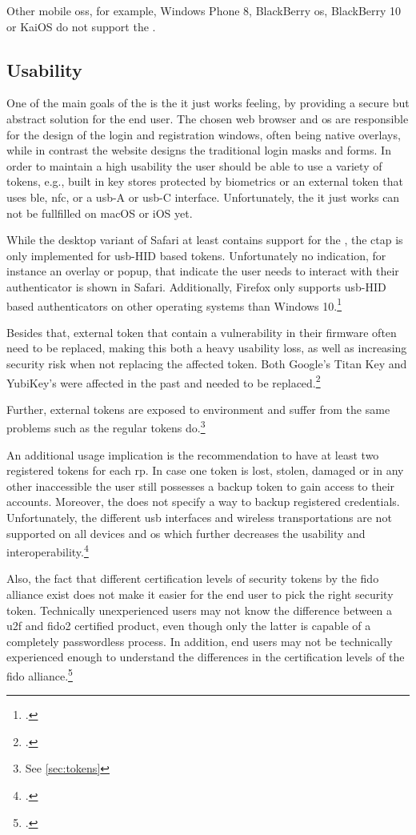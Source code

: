 Other mobile \glspl{os}, for example, Windows Phone 8, BlackBerry \gls{os}, BlackBerry 10 or KaiOS do not support the \wa.

\subsection{Usability}

One of the main goals of the \wa{} is the \frqq it just works\flqq{} feeling, by providing a secure but abstract solution for the end user. The chosen web browser and \gls{os} are responsible for the design of the login and registration windows, often being native overlays, while in contrast the website designs the traditional login masks and forms. In order to maintain a high usability the user should be able to use a variety of tokens, e.g., built in key stores protected by biometrics or an external token that uses \gls{ble}, \gls{nfc}, or a \gls{usb}-A or \gls{usb}-C interface. Unfortunately, the \frqq it just works\flqq{} can not be fullfilled on macOS or iOS yet.

While the desktop variant of Safari at least contains support for the \wa, the \gls{ctap} is only implemented for \gls{usb}-HID based tokens. Unfortunately no indication, for instance an overlay or popup, that indicate the user needs to interact with their authenticator is shown in Safari. Additionally, Firefox only supports \gls{usb}-HID based authenticators on other operating systems than Windows 10.\footcites[See][]{rust-authenticator}

Besides that, external token that contain a vulnerability in their firmware often need to be replaced, making this both a heavy usability loss, as well as increasing security risk when not replacing the affected token. Both Google's Titan Key and YubiKey's were affected in the past and needed to be replaced.\footcites[See][]{yubikey-heise}[See][]{titan-key}

Further, external tokens are exposed to environment and suffer from the same problems such as the regular tokens do.\footnote{See \autoref{sec:tokens}}

An additional usage implication is the recommendation to have at least two registered tokens for each \gls{rp}. In case one token is lost, stolen, damaged or in any other inaccessible the user still possesses a backup token to gain access to their accounts. Moreover, the \wa{} does not specify a way to backup registered credentials. Unfortunately, the different \gls{usb} interfaces and wireless transportations are not supported on all devices and \gls{os} which further decreases the usability and interoperability.\footcites[See][Chapter 13.6]{w3c}[See][15]{das2018johnny}

Also, the fact that different certification levels of security tokens by the \gls{fido} alliance exist does not make it easier for the end user to pick the right security token. Technically unexperienced users may not know the difference between a \gls{u2f} and \gls{fido}2 certified product, even though only the latter is capable of a completely passwordless process. In addition, end users may not be technically experienced enough to understand the differences in the certification levels of the \gls{fido} alliance.\footcites[See][]{fido-certification}
